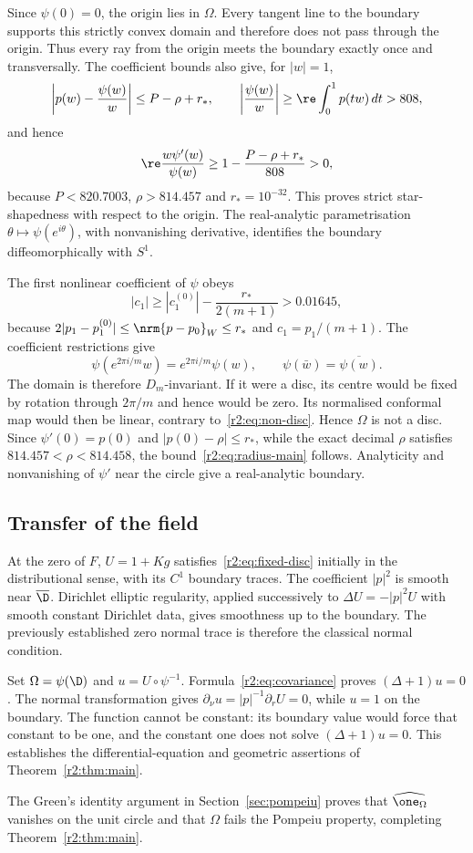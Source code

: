 Since $\psi(0)=0$, the origin lies in $\Omega$. Every tangent line to the boundary supports this strictly convex domain and therefore does not pass through the origin. Thus every ray from the origin meets the boundary exactly once and transversally. The coefficient bounds also give, for $|w|=1$,
\[
 \left|p(w)-\frac{\psi(w)}w\right|\le P-\rho+r_*,\qquad
 \left|\frac{\psi(w)}w\right|\ge\re\int_0^1p(tw)\,dt>808,
\]
and hence
\[
 \re\frac{w\psi'(w)}{\psi(w)}
 \ge1-\frac{P-\rho+r_*}{808}>0,
\]
because $P<820.7003$, $\rho>814.457$ and $r_*=10^{-32}$. This proves strict star-shapedness with respect to the origin. The real-analytic parametrisation $\theta\mapsto\psi(e^{i\theta})$, with nonvanishing derivative, identifies the boundary diffeomorphically with $S^1$.

The first nonlinear coefficient of $\psi$ obeys
\begin{equation}\label{r2:eq:non-disc}
 |c_1|\ge|c^{(0)}_1|-\frac{r_*}{2(m+1)}>0.01645,
\end{equation}
because $2|p_1-p^{(0)}_1|\le\nrm{p-p_0}_W\le r_*$ and $c_1=p_1/(m+1)$. The coefficient restrictions give
\[
 \psi(e^{2\pi i/m}w)=e^{2\pi i/m}\psi(w),\qquad
 \psi(\bar w)=\overline{\psi(w)}.
\]
The domain is therefore $D_m$-invariant. If it were a disc, its centre would be fixed by rotation through $2\pi/m$ and hence would be zero. Its normalised conformal map would then be linear, contrary to~\eqref{r2:eq:non-disc}. Hence $\Omega$ is not a disc. Since $\psi'(0)=p(0)$ and $|p(0)-\rho|\le r_*$, while the exact decimal $\rho$ satisfies $814.457<\rho<814.458$, the bound~\eqref{r2:eq:radius-main} follows. Analyticity and nonvanishing of $\psi'$ near the circle give a real-analytic boundary.

\subsection{Transfer of the field}
At the zero of $F$, $U=1+Kg$ satisfies~\eqref{r2:eq:fixed-disc} initially in the distributional sense, with its $C^1$ boundary traces. The coefficient $|p|^2$ is smooth near $\overline\D$. Dirichlet elliptic regularity, applied successively to $\Delta U=-|p|^2U$ with smooth constant Dirichlet data, gives smoothness up to the boundary. The previously established zero normal trace is therefore the classical normal condition.

Set $\Omega=\psi(\D)$ and $u=U\circ\psi^{-1}$. Formula~\eqref{r2:eq:covariance} proves $(\Delta+1)u=0$. The normal transformation gives $\partial_\nu u=|p|^{-1}\partial_rU=0$, while $u=1$ on the boundary. The function cannot be constant: its boundary value would force that constant to be one, and the constant one does not solve $(\Delta+1)u=0$. This establishes the differential-equation and geometric assertions of Theorem~\ref{r2:thm:main}.

The Green's identity argument in Section~\ref{sec:pompeiu} proves that $\widehat{\one_\Omega}$ vanishes on the unit circle and that $\Omega$ fails the Pompeiu property, completing Theorem~\ref{r2:thm:main}.
